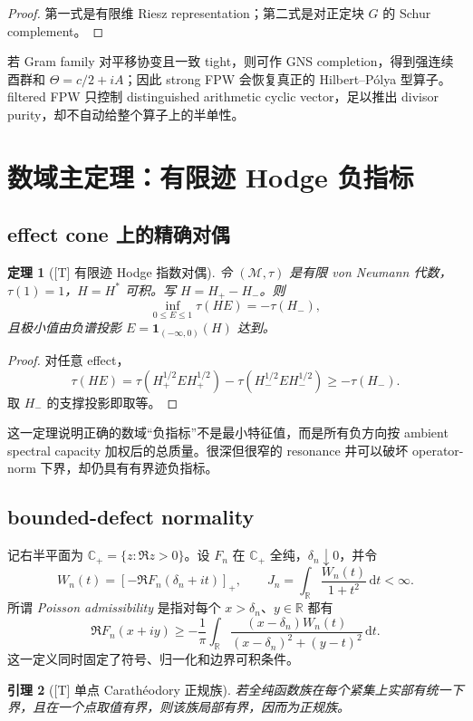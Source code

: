 \documentclass[UTF8,11pt,a4paper]{ctexart}
\newtheorem{theorem}{定理}[section]
\newtheorem{lemma}[theorem]{引理}
\theoremstyle{definition}
\theoremstyle{remark}
\newcommand{\C}{\mathbb C}
\newcommand{\R}{\mathbb R}
\newcommand{\dd}{\,\mathrm d}
\newcommand{\1}{\mathbf 1}
\newcommand{\cM}{\mathcal M}
\newcommand{\statusT}{\textnormal{[T]}}
\begin{document}
\begin{proof}
第一式是有限维 Riesz representation；第二式是对正定块 $G$ 的 Schur complement。
\end{proof}

若 Gram family 对平移协变且一致 tight，则可作 GNS completion，得到强连续酉群和 $\Theta=c/2+iA$；因此 strong FPW 会恢复真正的 Hilbert--P\'olya 型算子。filtered FPW 只控制 distinguished arithmetic cyclic vector，足以推出 divisor purity，却不自动给整个算子上的半单性。

\section{数域主定理：有限迹 Hodge 负指标}

\subsection{effect cone 上的精确对偶}

\begin{theorem}[\statusT{} 有限迹 Hodge 指数对偶]\label{thm:trace-duality}
令 $(\cM,\tau)$ 是有限 von Neumann 代数，$\tau(1)=1$，$H=H^*$ 可积。写 $H=H_+-H_-$。则
\[
  \inf_{0\leq E\leq1}\tau(HE)=-\tau(H_-),
\]
且极小值由负谱投影 $E=\1_{(-\infty,0)}(H)$ 达到。
\end{theorem}

\begin{proof}
对任意 effect，
\[
 \tau(HE)=\tau(H_+^{1/2}EH_+^{1/2})-
 \tau(H_-^{1/2}EH_-^{1/2})\geq-\tau(H_-).
\]
取 $H_-$ 的支撑投影即取等。
\end{proof}

这一定理说明正确的数域“负指标”不是最小特征值，而是所有负方向按 ambient spectral capacity 加权后的总质量。很深但很窄的 resonance 井可以破坏 operator-norm 下界，却仍具有有界迹负指标。

\subsection{bounded-defect normality}

记右半平面为 $\C_+=\{z:\Re z>0\}$。设 $F_n$ 在 $\C_+$ 全纯，$\delta_n\downarrow0$，并令
\[
 W_n(t)=[-\Re F_n(\delta_n+it)]_+,
 \qquad
 J_n=\int_\R\frac{W_n(t)}{1+t^2}\dd t<\infty.
\]
所谓 \emph{Poisson admissibility} 是指对每个 $x>\delta_n$、$y\in\R$ 都有
\[
 \Re F_n(x+iy)\geq-\frac1\pi\int_\R
 \frac{(x-\delta_n)W_n(t)}{(x-\delta_n)^2+(y-t)^2}\dd t.
\]
这一定义同时固定了符号、归一化和边界可积条件。

\begin{lemma}[\statusT{} 单点 Carath\'eodory 正规族]
若全纯函数族在每个紧集上实部有统一下界，且在一个点取值有界，则该族局部有界，因而为正规族。
\end{lemma}
\end{document}
